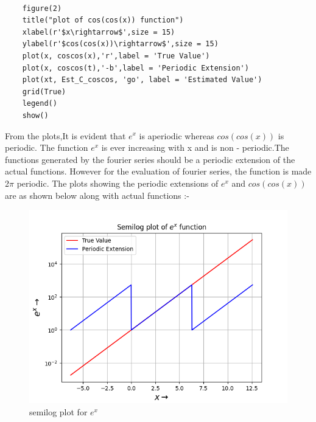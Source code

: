 \documentclass[11pt, a4paper]{article}
\begin{document}
\begin{verbatim}

    figure(2) 
    title("plot of cos(cos(x)) function") 
    xlabel(r'$x\rightarrow$',size = 15)	
    ylabel(r'$cos(cos(x))\rightarrow$',size = 15)
    plot(x, coscos(x),'r',label = 'True Value')	
    plot(x, coscos(t),'-b',label = 'Periodic Extension') 
    plot(xt, Est_C_coscos, 'go', label = 'Estimated Value')	
    grid(True)  
    legend() 
    show()
\end{verbatim}   
   
From the plots,It is evident that $e^{x}$ is aperiodic whereas $cos(cos(x))$ is periodic. The function $e^x$ is ever increasing with x and is non - periodic.The functions generated by the fourier series should be a periodic extension of  the actual functions. However for the evaluation of fourier series, the function is made 2$\pi$ periodic. The plots showing the periodic extensions of $e^{x}$ and $cos(cos(x))$ are as shown below along with actual functions :-

    \begin{figure}[!tbh]
   	\centering
   	\includegraphics[scale=0.5]{Ass4_Figure_2.png}   
   	\caption{semilog plot for $e^x$}
   	\label{fig:sample}
   \end{figure} 
   
\end{document}
